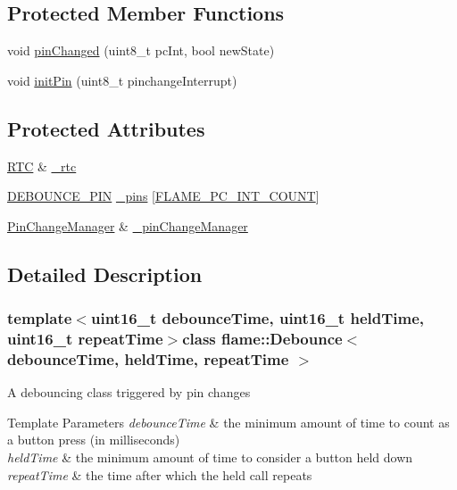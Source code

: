 \subsection*{Protected Member Functions}
\begin{DoxyCompactItemize}
\item 
void \hyperlink{classflame_1_1_debounce_ae91dc73a4becacf5f13456d1ca3b6185}{pin\-Changed} (uint8\-\_\-t pc\-Int, bool new\-State)
\item 
void \hyperlink{classflame_1_1_debounce_a659d50217bff015bc109223737899a45}{init\-Pin} (uint8\-\_\-t pinchange\-Interrupt)
\end{DoxyCompactItemize}
\subsection*{Protected Attributes}
\begin{DoxyCompactItemize}
\item 
\hyperlink{classflame_1_1_r_t_c}{R\-T\-C} \& \hyperlink{classflame_1_1_debounce_abaed54518db29d8653452f167c6b6653}{\-\_\-rtc}
\item 
\hyperlink{namespaceflame_a1909d0b4150ee5ef201afa40b431b811}{D\-E\-B\-O\-U\-N\-C\-E\-\_\-\-P\-I\-N} \hyperlink{classflame_1_1_debounce_a8f167eb7572e66526be7824b79d334c3}{\-\_\-pins} \mbox{[}\hyperlink{attiny85_8h_ab39f7ddad6e692db1c00115db776636f}{F\-L\-A\-M\-E\-\_\-\-P\-C\-\_\-\-I\-N\-T\-\_\-\-C\-O\-U\-N\-T}\mbox{]}
\item 
\hyperlink{classflame_1_1_pin_change_manager}{Pin\-Change\-Manager} \& \hyperlink{classflame_1_1_debounce_a40985315ee31ef4d28c16ebc32cc3af9}{\-\_\-pin\-Change\-Manager}
\end{DoxyCompactItemize}


\subsection{Detailed Description}
\subsubsection*{template$<$uint16\-\_\-t debounce\-Time, uint16\-\_\-t held\-Time, uint16\-\_\-t repeat\-Time$>$class flame\-::\-Debounce$<$ debounce\-Time, held\-Time, repeat\-Time $>$}

A debouncing class triggered by pin changes 
\begin{DoxyTemplParams}{Template Parameters}
{\em debounce\-Time} & the minimum amount of time to count as a button press (in milliseconds) \\
\hline
{\em held\-Time} & the minimum amount of time to consider a button held down \\
\hline
{\em repeat\-Time} & the time after which the held call repeats \\
\hline
\end{DoxyTemplParams}


